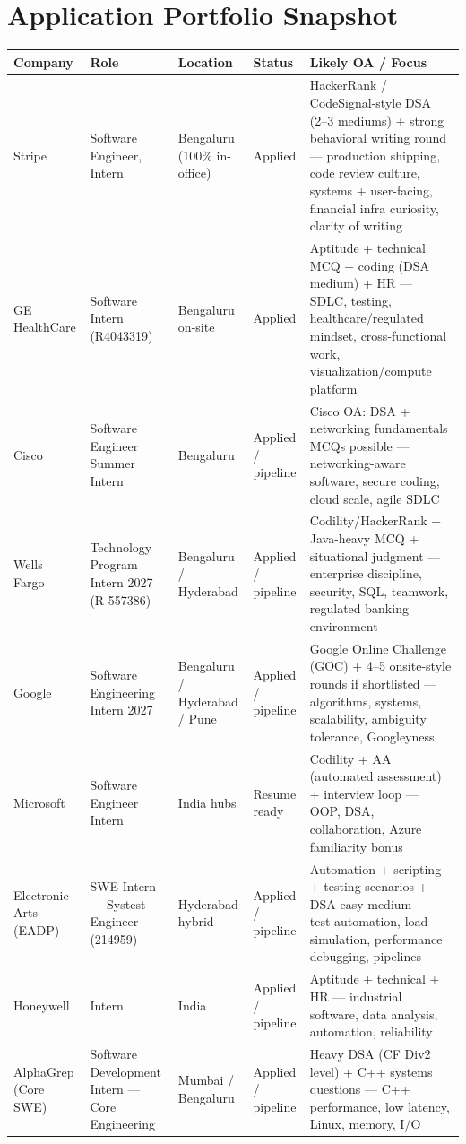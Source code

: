 \documentclass[9pt,a4paper]{article}
\begin{document}
\newpage
\section{Application Portfolio Snapshot}
\begin{longtable}{@{}p{2.2cm}p{3.5cm}p{2cm}p{1.5cm}p{5cm}@{}}
\toprule
\textbf{Company} & \textbf{Role} & \textbf{Location} & \textbf{Status} & \textbf{Likely OA / Focus} \\
\midrule
\endhead
Stripe & Software Engineer, Intern & Bengaluru (100\% in-office) & Applied & HackerRank / CodeSignal-style DSA (2--3 mediums) + strong behavioral writing round --- production shipping, code review culture, systems + user-facing, financial infra curiosity, clarity of writing \\
GE HealthCare & Software Intern (R4043319) & Bengaluru on-site & Applied & Aptitude + technical MCQ + coding (DSA medium) + HR --- SDLC, testing, healthcare/regulated mindset, cross-functional work, visualization/compute platform \\
Cisco & Software Engineer Summer Intern & Bengaluru & Applied / pipeline & Cisco OA: DSA + networking fundamentals MCQs possible --- networking-aware software, secure coding, cloud scale, agile SDLC \\
Wells Fargo & Technology Program Intern 2027 (R-557386) & Bengaluru / Hyderabad & Applied / pipeline & Codility/HackerRank + Java-heavy MCQ + situational judgment --- enterprise discipline, security, SQL, teamwork, regulated banking environment \\
Google & Software Engineering Intern 2027 & Bengaluru / Hyderabad / Pune & Applied / pipeline & Google Online Challenge (GOC) + 4--5 onsite-style rounds if shortlisted --- algorithms, systems, scalability, ambiguity tolerance, Googleyness \\
Microsoft & Software Engineer Intern & India hubs & Resume ready & Codility + AA (automated assessment) + interview loop --- OOP, DSA, collaboration, Azure familiarity bonus \\
Electronic Arts (EADP) & SWE Intern --- Systest Engineer (214959) & Hyderabad hybrid & Applied / pipeline & Automation + scripting + testing scenarios + DSA easy-medium --- test automation, load simulation, performance debugging, pipelines \\
Honeywell & Intern & India & Applied / pipeline & Aptitude + technical + HR --- industrial software, data analysis, automation, reliability \\
AlphaGrep (Core SWE) & Software Development Intern --- Core Engineering & Mumbai / Bengaluru & Applied / pipeline & Heavy DSA (CF Div2 level) + C++ systems questions --- C++ performance, low latency, Linux, memory, I/O \\

\end{longtable}
\end{document}
